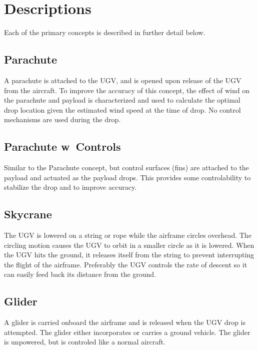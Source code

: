 \documentclass[]{auvsi_doc}
\begin{document}
\begin{AUVSITitlePage}
\begin{artifacttable}
\end{artifacttable}
\end{AUVSITitlePage}


\section{Descriptions}
Each of the primary concepts is described in further detail below. 

\subsection{Parachute}
A parachute is attached to the UGV, and is opened upon release of the UGV from the aircraft. To improve the accuracy of this concept, the effect of wind on the parachute and payload is characterized and used to calculate the optimal drop location given the estimated wind speed at the time of drop. No control mechanisms are used during the drop.

\subsection{Parachute w\ Controls}
Similar to the Parachute concept, but control surfaces (fins) are attached to the payload and actuated as the payload drops. This provides some controlability to stabilize the drop and to improve accuracy.

\subsection{Skycrane}
The UGV is lowered on a string or rope while the airframe circles overhead. The circling motion causes the UGV to orbit in a smaller circle as it is lowered. When the UGV hits the ground, it releases itself from the string to prevent interrupting the flight of the airframe. Preferably the UGV controls the rate of descent so it can easily feed back its distance from the ground.

\subsection{Glider}
A glider is carried onboard the airframe and is released when the UGV drop is attempted. The glider either incorporates or carries a ground vehicle. The glider is unpowered, but is controled like a normal aircraft. 
\end{document}
